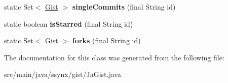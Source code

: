 \begin{DoxyCompactItemize}
\mbox{\label{classssynx_1_1gist_1_1JaGist_1_1GetGist_ac9697328e588cb2ef8cf132a5bafc5a5}} 
static Set$<$ \hyperlink{classssynx_1_1gist_1_1Gist}{Gist} $>$ {\bfseries single\+Commits} (final String id)
\item 
\mbox{\label{classssynx_1_1gist_1_1JaGist_1_1GetGist_a1436b781a2eec7d196b79c2d3a3a22a0}} 
static boolean {\bfseries is\+Starred} (final String id)
\item 
\mbox{\label{classssynx_1_1gist_1_1JaGist_1_1GetGist_a7d28f723dadd2ac21762657354324e8d}} 
static Set$<$ \hyperlink{classssynx_1_1gist_1_1Gist}{Gist} $>$ {\bfseries forks} (final String id)
\end{DoxyCompactItemize}


The documentation for this class was generated from the following file\+:\begin{DoxyCompactItemize}
\item 
src/main/java/ssynx/gist/Ja\+Gist.\+java\end{DoxyCompactItemize}
